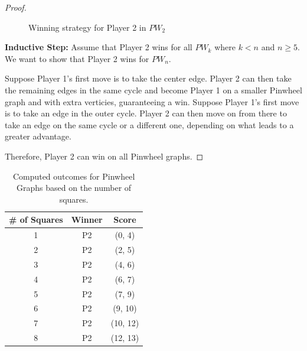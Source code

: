 \documentclass{article}
\begin{document}
\begin{proof}
    \begin{figure}[hbt!]
\centering
{}
\caption{Winning strategy for Player 2 in $PW_2$}
\label{fig:pw2}
\end{figure}
\FloatBarrier 

\textbf{Inductive Step:} Assume that Player 2 wins for all $PW_k$ where $k < n$ and $n \geq 5$. We want to show that Player 2 wins for $PW_n$.

Suppose Player 1's first move is to take the center edge. Player 2 can then take the remaining edges in the same cycle and become Player 1 on a smaller Pinwheel graph and with extra verticies, guaranteeing a win. Suppose Player 1's first move is to take an edge in the outer cycle. Player 2 can then move on from there to take an edge on the same cycle or a different one, depending on what leads to a greater advantage. 


Therefore, Player 2 can win on all Pinwheel graphs.
\end{proof}

\begin{table}[hbt!]
\centering
\begin{tabular}{|c|c|c|}
\hline
\textbf{\# of Squares} & \textbf{Winner} & \textbf{Score} \\
\hline
1 & P2 & (0, 4) \\
2 & P2 & (2, 5) \\
3 & P2 & (4, 6) \\
4 & P2 & (6, 7) \\
5 & P2 & (7, 9) \\
6 & P2 & (9, 10) \\
7 & P2 & (10, 12) \\
8 & P2 & (12, 13) \\
\hline
\end{tabular}
\caption{Computed outcomes for Pinwheel Graphs based on the number of squares.}
\label{table:pinwheel-graph-outcomes}
\end{table}
\FloatBarrier 
\end{document}
